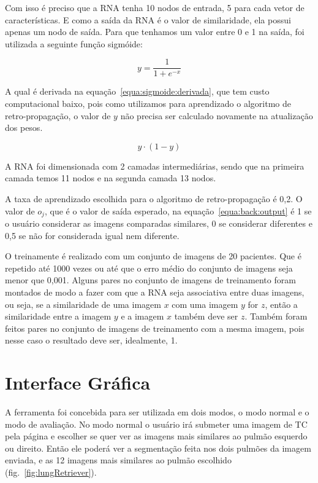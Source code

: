 Com isso é preciso que a RNA tenha 10 nodos de entrada, 5 para cada vetor de características. E como a saída da RNA é o valor de similaridade, ela possui apenas um nodo de saída. Para que tenhamos um valor entre 0 e 1 na saída, foi utilizada a seguinte função sigmóide:

\begin{equation}
	y = \frac{1}{1 + e^{-x}}
\end{equation}

A qual é derivada na equação~\ref{equa:sigmoide:derivada}, que tem custo computacional baixo, pois como utilizamos para aprendizado o algoritmo de retro-propagação, o valor de $y$ não precisa ser calculado novamente na atualização dos pesos.

\begin{equation}
	y \cdot (1 - y)
	\label{equa:sigmoide:derivada}
\end{equation}

A RNA foi dimensionada com 2 camadas intermediárias, sendo que na primeira camada temos 11 nodos e na segunda camada 13 nodos.

A taxa de aprendizado escolhida para o algoritmo de retro-propagação é 0,2. O valor de $o_j$, que é o valor de saída esperado, na equação~\ref{equa:back:output} é 1 se o usuário considerar as imagens comparadas similares, 0 se considerar diferentes e 0,5 se não for considerada igual nem diferente.

O treinamente é realizado com um conjunto de imagens de 20 pacientes. Que é repetido até 1000 vezes ou até que o erro médio do conjunto de imagens seja menor que 0,001. Alguns pares no conjunto de imagens de treinamento foram montados de modo a fazer com que a RNA seja associativa entre duas imagens, ou seja, se a similaridade de uma imagem $x$ com uma imagem $y$ for $z$, então a similaridade entre a imagem $y$ e a imagem $x$ também deve ser $z$. Também foram feitos pares no conjunto de imagens de treinamento com a mesma imagem, pois nesse caso o resultado deve ser, idealmente, 1.

\section{Interface Gráfica}

A ferramenta foi concebida para ser utilizada em dois modos, o modo normal e o modo de avaliação. No modo normal o usuário irá submeter uma imagem de TC pela página e escolher se quer ver as imagens mais similares ao pulmão esquerdo ou direito. Então ele poderá ver a segmentação feita nos dois pulmões da imagem enviada, e as 12 imagens mais similares ao pulmão escolhido (fig.~\ref{fig:lungRetriever}).

